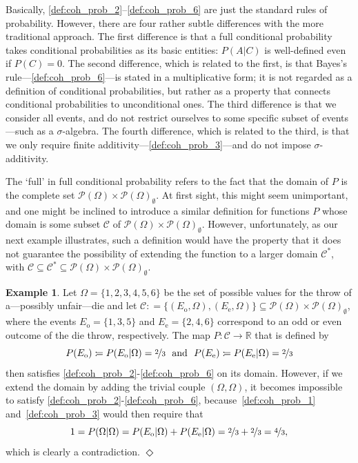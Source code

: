 \documentclass[10pt,a4paper]{paper}
\theoremstyle{definition}
\newtheorem{exmp}{Example}%
\newcommand{\reals}{\mathbb{R}}
\newcommand{\paths}{\Omega}
\newcommand{\power}{\mathcal{P}(\paths)}
\newcommand{\nonemptypower}{\power_{\emptyset}}
\newcommand{\coloneqq}{:\!=}
\newcommand{\exampleend}{\hfill$\Diamond$}
\begin{document}
Basically, \ref{def:coh_prob_2}--\ref{def:coh_prob_6} are just the standard rules of probability. However, there are four rather subtle differences with the more traditional approach. The first difference is that a full conditional probability takes conditional probabilities as its basic entities: $P(A\vert C)$ is well-defined even if $P(C)=0$. The second difference, which is related to the first, is that Bayes's rule---\ref{def:coh_prob_6}---is stated in a multiplicative form; it is not regarded as a definition of conditional probabilities, but rather as a property that connects conditional probabilities to unconditional ones. The third difference is that we consider all events, and do not restrict ourselves to some specific subset of events---such as a $\sigma$-algebra. The fourth difference, which is related to the third, is that we only require finite additivity---\ref{def:coh_prob_3}---and do not impose $\sigma$-additivity.


The `full' in full conditional probability refers to the fact that the domain of $P$ is the complete set $\power\times\nonemptypower$. At first sight, this might seem unimportant, and one might be inclined to introduce a similar definition for functions $P$ whose domain is some subset $\mathcal{C}$ of $\power\times\nonemptypower$. However, unfortunately, as our next example illustrates, such a definition would have the property that it does not guarantee the possibility of extending the function to a larger domain $\mathcal{C}^*$, with $\mathcal{C}\subseteq\mathcal{C}^*\subseteq\power\times\nonemptypower$.

\begin{exmp}\label{exmp:F1F4cannotbeextended}
Let $\Omega=\{1,2,3,4,5,6\}$ be the set of possible values for the throw of a---possibly unfair---die and let $\mathcal{C}\coloneqq\{(E_{\mathrm{o}},\Omega),(E_{\mathrm{e}},\Omega)\}\subseteq\power\times\nonemptypower$, where the events $E_{\mathrm{o}}=\{1,3,5\}$ and $E_{\mathrm{e}}=\{2,4,6\}$ correspond to an odd or even outcome of the die throw, respectively. The map $P\colon\mathcal{C}\to\reals$ that is defined by
\begin{equation*}
P(E_{\mathrm{o}})\coloneqq P(E_{\mathrm{o}}\vert\Omega)=\nicefrac{2}{3}
~\text{ and }~
P(E_{\mathrm{e}})\coloneqq P(E_{\mathrm{e}}\vert\Omega)=\nicefrac{2}{3}
\end{equation*}
then satisfies \ref{def:coh_prob_2}-\ref{def:coh_prob_6} on its domain. However, if we extend the domain by adding the trivial couple $(\Omega,\Omega)$, it becomes impossible to satisfy \ref{def:coh_prob_2}-\ref{def:coh_prob_6}, because~\ref{def:coh_prob_1} and~\ref{def:coh_prob_3} would then require that
\begin{equation*}
1=P(\Omega\vert\Omega)=P(E_{\mathrm{o}}\vert\Omega)+P(E_{\mathrm{e}}\vert\Omega)=\nicefrac{2}{3}+\nicefrac{2}{3}=\nicefrac{4}{3},
\end{equation*}
which is clearly a contradiction.
\exampleend
\end{exmp}
\end{document}
